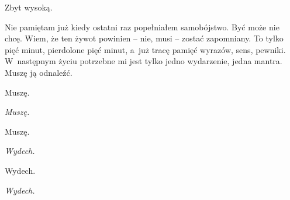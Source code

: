 Zbyt wysoką. 

Nie pamiętam już kiedy ostatni raz popełniałem samobójstwo. Być może nie chcę. Wiem, że ten żywot powinien -- nie, musi -- zostać zapomniany. To tylko pięć minut, pierdolone pięć minut, a~już tracę pamięć wyrazów, sens, pewniki. W~następnym życiu potrzebne mi jest tylko jedno wydarzenie, jedna mantra. Muszę ją odnaleźć.

Muszę.

\hspace{2em}\emph{Muszę.}

Muszę.

\hspace{2em}\emph{Wydech.}

Wydech.

\hspace{2em}\emph{Wydech.}
